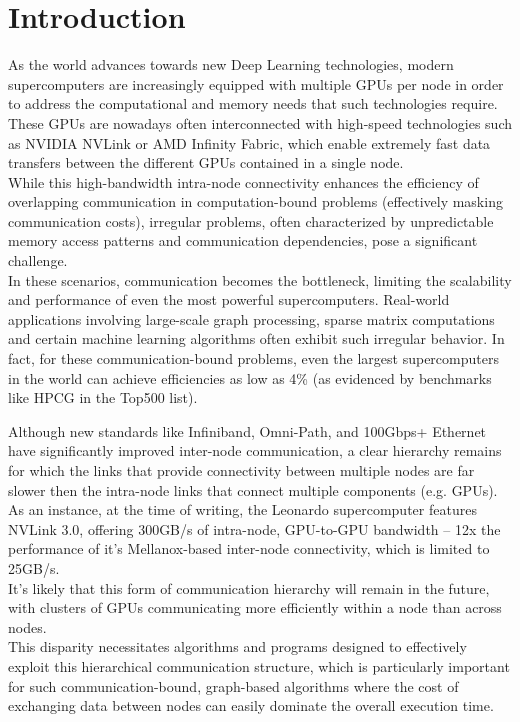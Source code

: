 \chapter{Introduction}
\label{cha:introduction}
\setlength{\parindent}{0pt}
\setlength{\parskip}{0.5em}

As the world advances towards new Deep Learning technologies, modern supercomputers are increasingly equipped with multiple GPUs per node in order to address the computational and memory needs that such technologies require.\\
These GPUs are nowadays often interconnected with high-speed technologies such as NVIDIA NVLink or AMD Infinity Fabric, which enable extremely fast data transfers between the different GPUs contained in a single node. \\
While this high-bandwidth intra-node connectivity enhances the efficiency of overlapping communication in computation-bound problems (effectively masking communication costs), irregular problems, often characterized by unpredictable memory access patterns and communication dependencies, pose a significant challenge.\\
In these scenarios, communication becomes the bottleneck, limiting the scalability and performance of even the most powerful supercomputers. Real-world applications involving large-scale graph processing, sparse matrix computations and certain machine learning algorithms often exhibit such irregular behavior. In fact, for these communication-bound problems, even the largest supercomputers in the world can achieve efficiencies as low as 4\% (as evidenced by benchmarks like HPCG in the Top500 list).

Although new standards like Infiniband, Omni-Path, and 100Gbps+ Ethernet have significantly improved inter-node communication, a clear hierarchy remains for which the links that provide connectivity between multiple nodes are far slower then the intra-node links that connect multiple components (e.g. GPUs). \\
As an instance, at the time of writing, the Leonardo supercomputer features NVLink 3.0, offering 300GB/s of intra-node, GPU-to-GPU bandwidth -- 12x the performance of it's Mellanox-based inter-node connectivity, which is limited to 25GB/s. \\
It's likely that this form of communication hierarchy will remain in the future, with clusters of GPUs communicating more efficiently within a node than across nodes.\\
This disparity necessitates algorithms and programs designed to effectively exploit this hierarchical communication structure, which is particularly important for such communication-bound, graph-based algorithms where the cost of exchanging data between nodes can easily dominate the overall execution time.

